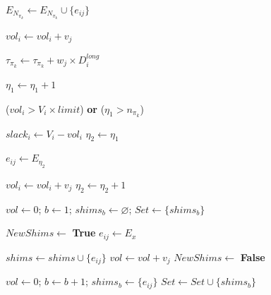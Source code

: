 \documentclass[preprint]{elsarticle}
\begin{document}
\begin{algorithm}[H]
\begin{algorithmic}[1]
					\State $E_{N_{\pi_k}} \gets E_{N_{\pi_k}} \cup \{e_{ij}\}$
					
					\State $vol_i \gets vol_i + v_j$
					
					\State $\tau_{\pi_k} \gets \tau_{\pi_k} + w_j \times D_i^{long}$
					
					\State $\eta_1 \gets \eta_1 + 1$ 
				
				\EndIf
			\Until ($vol_i > V_i \times limit$) {\bf or} ($\eta_1>n_{\pi_k}$)		  \label{shims:endfirst}	
				

			\State $slack_i \gets V_i - vol_i$  \label{shims:beginsecond}
			\State $\eta_2 \gets \eta_1$  \label{shims:eta2a}

					\State $e_{ij} \gets E_{\eta_2}$
			
					\State $vol_i \gets vol_i + v_j$
					\State $\eta_2 \gets \eta_2 + 1$  \label{shims:eta2} \label{shims:endsecond} 
			\EndWhile 
				
			
			\State $vol \gets 0$; $b \gets 1$; $shims_b \gets \varnothing$; $Set \gets \{ shims_b \}$  \label{shims:beginthird} 
			
		
			
			 \label{edges_indexes}
				
				  
				\EndIf
			
				\State $NewShims \gets$ {\bf True} \label{new_shims}
				\State $e_{ij} \gets E_x$
				
				 \label{shims_set}
				
					
						\State $shims \gets shims \cup \{e_{ij}\}$
						\State $vol \gets vol + v_j$
						\State $NewShims \gets$ {\bf False} \label{new_shims_false}
						
					\EndIf
				
				\EndFor 
			
				 \label{new_shims2}
					\State $vol \gets 0$; $b \gets b + 1$;  $shims_b \gets \{e_{ij}\}$
					\State $Set \gets Set \cup \{ shims_b \}$
				\EndIf
			
			\EndFor 
			

\end{algorithmic}
\end{algorithm}
\end{document}
